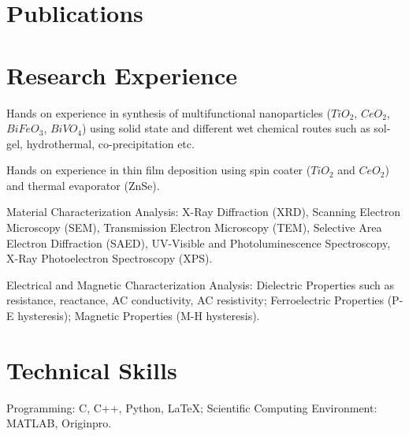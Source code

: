 \documentclass[a4paper,20pt]{article}
\begin{document}
\vspace{-5pt}
\section{Publications}
	\nocite{*}
	

\vspace{-5pt}
\section{Research Experience}
	\begin{description}[font=$\bullet$]
		\item{Hands on experience in synthesis of multifunctional nanoparticles ($TiO_{2}$, $CeO_{2}$, $BiFeO_{3}$, $BiVO_{4}$) using solid state and different wet chemical routes such as sol-gel, hydrothermal, co-precipitation etc.}
		\vspace{-5pt}
		\item{Hands on experience in thin film deposition using spin coater ($TiO_{2}$ and $CeO_{2}$) and thermal evaporator (ZnSe).}
		\vspace{-5pt}
		\item{Material Characterization Analysis: X-Ray Diffraction (XRD), Scanning Electron Microscopy (SEM), Transmission Electron Microscopy (TEM), Selective Area Electron Diffraction (SAED), UV-Visible and Photoluminescence Spectroscopy, X-Ray Photoelectron Spectroscopy (XPS).}
		\vspace{-5pt}
		\item{Electrical and Magnetic Characterization Analysis: Dielectric Properties such as resistance, reactance, AC conductivity, AC resistivity; Ferroelectric Properties (P-E hysteresis); Magnetic Properties (M-H hysteresis).}
		\vspace{-5pt}
		
	\end{description}
	
\vspace{-5pt}
\section{Technical Skills}
	Programming: C, C++, Python, \LaTeX; Scientific Computing Environment: MATLAB, Originpro.\\ 
	
\end{document}
